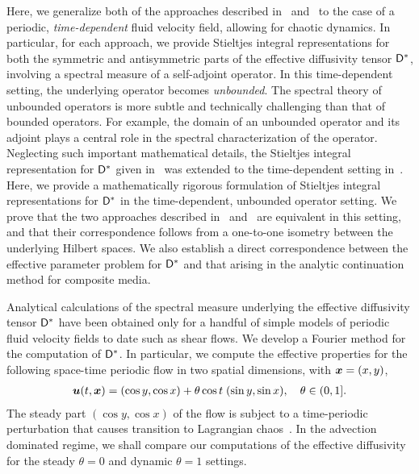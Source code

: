 \documentclass[amsa]{ipart}
\begin{document}
Here, we generalize both of the approaches described
in~\cite{Avellaneda:PRL-753,Avellaneda:CMP-339}
and~\cite{Pavliotis:PHD_Thesis} to the case of a periodic,
\emph{time-dependent} fluid velocity field, allowing for chaotic
dynamics. In particular, for each approach, we provide Stieltjes
integral representations for both the symmetric and antisymmetric
parts of the effective diffusivity tensor $\mathsf{D}^*$, involving a
spectral measure of a self-adjoint operator. In this time-dependent
setting, the underlying operator becomes \emph{unbounded}. The
spectral theory of unbounded operators is more subtle and technically
challenging than that of bounded operators. For example, the domain of
an unbounded operator and its adjoint plays a central role in the
spectral characterization of the operator. Neglecting such important
mathematical details, the Stieltjes integral representation for
$\mathsf{D}^*$ given in~\cite{Avellaneda:PRL-753,Avellaneda:CMP-339} was
extended to the time-dependent setting
in~\cite{Avellaneda:PRE:3249}. Here, we provide a mathematically
rigorous formulation of Stieltjes integral representations for $\mathsf{D}^*$
in the time-dependent, unbounded operator setting. We prove that the
two approaches described
in~\cite{Avellaneda:PRL-753,Avellaneda:CMP-339}
and~\cite{Pavliotis:PHD_Thesis} are equivalent in this setting, and
that their correspondence follows from a one-to-one isometry between
the underlying Hilbert spaces. We also establish a direct
correspondence between the effective parameter problem for $\mathsf{D}^*$ and
that arising in the analytic continuation method for composite
media.






Analytical calculations of the spectral measure underlying the
effective diffusivity tensor $\mathsf{D}^*$ have been obtained
only for a handful of simple models of periodic fluid velocity
fields to date such as shear flows. We develop a 
Fourier method for the computation of $\mathsf{D}^*$. In particular, we 
compute the effective properties for the following space-time periodic
flow in two spatial dimensions, with $\boldsymbol{x}=(x,y)$,
%
\begin{align}\label{eq:tdcell}
\vecu (t,\vecx)=(\cos{y},\cos{x}) + \theta\cos{t}\;(\sin{y},\sin{x}),
\quad
\theta \in (0,1].
\end{align}
%
The steady part $(\cos{y}, \cos{x})$ of the flow is subject to a
time-periodic perturbation that causes transition to Lagrangian
chaos~\cite{Biferale:PF:2725,ZCX_2015}. In the advection dominated
regime, we shall compare our computations of the effective diffusivity
for the steady $\theta=0$ and dynamic $\theta=1$ settings.  
\end{document}
